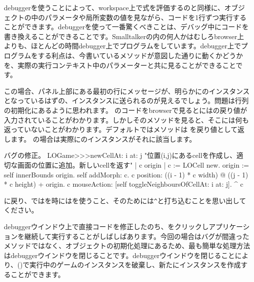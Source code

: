 \documentclass[a4paper,10pt,twoside]{book}
\begin{document}
debuggerを使うことによって、workspace上で式を評価するのと同様に、オブジェクトの中のパラメータや局所変数の値を見ながら、コードを1行ずつ実行することができます。debuggerを使って一番驚くべきことは、デバッグ中にコードを書き換えることができることです。Smalltalkerの内の何人かはむしろbrowser上よりも、ほとんどの時間debugger上でプログラムをしています。debugger上でプログラムをする利点は、今書いているメソッドが意図した通りに動くかどうかを、実際の実行コンテキスト中のパラメーターと共に見ることができることです。

この場合、パネル上部にある最初の行にメッセージが、明らかにのインスタンスとなっているはずの、インスタンスに送られるのが見えるでしょう。問題は行列の初期化にあるように思われます。
のコードをbrowserで見るとにはの戻り値が入力されていることがわかります。しかしそのメソッドを見ると、そこには何も返っていないことがわかります。デフォルトではメソッドは を戻り値として返します。  の場合は実際にのインスタンスがそれに該当します。

\dothis{debuggerウインドウを閉じで下さい。
その後\ct{c}を返すために、``\ct{^ c}''式を \ct{LOGame>>>newCellAt:at:}メソッドの最後に追加して下さい。
(\mthref{newCellAt:at:nobug}参照。)}

\begin{method}{バグの修正。}
LOGame>>>newCellAt: i at: j
   "位置(i,j)にあるcellを作成し、適切な画面の位置に追加。新しいcellを返す"
   | c origin |
   c := LOCell new.
   origin := self innerBounds origin.
   self addMorph: c.
   c position: ((i - 1) * c width) @ ((j - 1) * c height) + origin.
   c mouseAction: [self toggleNeighboursOfCellAt: i at: j].
   ^ c
\end{method}

\noindent
{}に戻り、\st{}ではを時には\ct{^}を使うこと、そのためには\verb|^|と打ち込むことを思い出してください。

debuggerウインドウ上で直接コードを修正したのち、をクリックしアプリケーションを継続して実行することがしばしばあります。今回の場合はバグが間違ったメソッドではなく、オブジェクトの初期化処理にあるため、最も簡単な処理方法はdebuggerウインドウを閉じることです。debuggerウインドウを閉じることにより、()で実行中のゲームのインスタンスを破棄し、新たにインスタンスを作成することができます。
\end{document}
